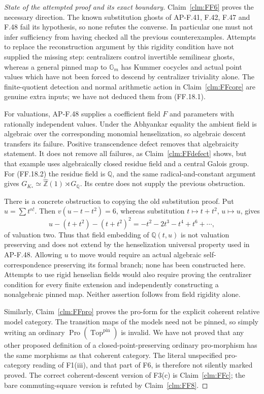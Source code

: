\begin{proof}[State of the attempted proof and its exact boundary]
Claim~\ref{clm:FF6} proves the necessary direction. The known
substitution ghosts of AP-F.41, F.42, F.47 and F.48 fail its
hypothesis, so none refutes the converse. In particular one must
not infer sufficiency from having checked all the previous
counterexamples. Attempts to replace the reconstruction argument
by this rigidity condition have not supplied the missing step:
centralizers control invertible semilinear ghosts, whereas a
general pinned map to \(\mathbb G_m\) has Kummer cocycles and
actual point values which have not been forced to descend by
centralizer triviality alone. The finite-quotient detection and
normal arithmetic action in Claim~\ref{clm:FFcore} are genuine
extra inputs; we have not deduced them from (FF.18.1).

For valuations, AP-F.48 supplies a coefficient field \(F\) and
parameters with rationally independent values. Under the
Abhyankar equality the ambient field is algebraic over the
corresponding monomial henselization, so algebraic descent
transfers its failure. Positive transcendence defect removes
that algebraicity statement. It does not remove all failures,
as Claim~\ref{clm:FFdefect} shows, but that example uses
algebraically closed residue field and a central Galois group.
For (FF.18.2) the residue field is \(\mathbb Q\), and the
same radical-and-constant argument gives
\(G_{K_*}\simeq\widehat{\mathbb Z}(1)\rtimes G_{\mathbb Q}\).
Its centre does not supply the previous obstruction.

There is a concrete obstruction to copying the old substitution
proof. Put \(u=\sum t^{n!}\). Then
\(v(u-t-t^2)=6\), whereas substitution
\(t\mapsto t+t^2\), \(u\mapsto u\), gives
\[
 u-(t+t^2)-(t+t^2)^2
       =-t^2-2t^3-t^4+t^6+\cdots,
\]
of valuation two. Thus that field embedding of
\(\mathbb Q(t,u)\) is not valuation preserving and does not
extend by the henselization universal property used in AP-F.48.
Allowing \(u\) to move would require an actual algebraic
self-correspondence preserving its formal branch; none has been
constructed here. Attempts to use rigid henselian fields would
also require proving the centralizer condition for every finite
extension and independently constructing a nonalgebraic pinned
map. Neither assertion follows from field rigidity alone.

Similarly, Claim~\ref{clm:FFpro} proves the pro-form for the
explicit coherent relative model category. The transition maps
of the models need not be pinned, so simply writing an ordinary
\(\operatorname{Pro}(\operatorname{Top}^{\mathrm{pin}})\)
is invalid. We have not proved that any other proposed definition
of a closed-point-preserving ordinary pro-morphism has the same
morphisms as that coherent category. The literal unspecified
pro-category reading of F1(iii), and that part of F6, is therefore
not silently marked proved. The correct coherent-descent version
of F3(c) is Claim~\ref{clm:FFc}; the bare commuting-square
version is refuted by Claim~\ref{clm:FF8}.
\end{proof}

